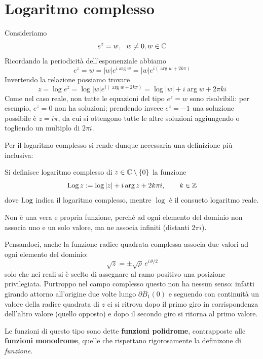 \section{Logaritmo complesso}

Consideriamo
\begin{equation*}
e^{z} = w, \ \ w\neq 0, w\in \mathbb{C}
\end{equation*}
Ricordando la periodicità dell'esponenziale abbiamo
\begin{equation*}
e^{z} = w = |w| e^{i\arg w}= |w| e^{i(\arg w+2k\pi)}
\end{equation*}
Invertendo la relazione possiamo trovare
\begin{equation*}
z=\log e^z=\log |w| e^{i(\arg w+2k\pi)}=\log|w|+i\arg w+2\pi k i
\end{equation*}
Come nel caso reale, non tutte le equazioni del tipo $e^z=w$ sono risolvibili: per esempio, $e^z=0$ non ha soluzioni; prendendo invece $e^z=-1$ una soluzione possibile è $z=i\pi$, da cui si ottengono tutte le altre soluzioni aggiungendo o togliendo un multiplo di $2\pi i$.

Per il logaritmo complesso si rende dunque necessaria una definizione più inclusiva:
\begin{defn}
Si definisce logaritmo complesso di $z\in\mathbb{C}\setminus\{0\}$ la funzione
\begin{equation*}
\operatorname{Log} z:=\log|z|+i\arg z+2k\pi i,\qquad  k\in \mathbb{Z}
\end{equation*}
dove $\operatorname{Log}$ indica il logaritmo complesso, mentre $\log$ è il consueto logaritmo reale.
\end{defn}
Non è una vera e propria funzione, perché ad ogni elemento del dominio non associa uno e un solo valore, ma ne associa infiniti (distanti $2\pi i$).

Pensandoci, anche la funzione radice quadrata complessa associa due valori ad ogni elemento del dominio:
$$
\sqrt{z}=\pm\sqrt{\rho}\,e^{i\,\theta/2}
$$
solo che nei reali si è scelto di assegnare al ramo positivo una posizione privilegiata. Purtroppo nel campo complesso questo non ha nessun senso: infatti girando attorno all'origine due volte lungo $\partial B_1(0)$ e seguendo con continuità un valore della radice quadrata di $z$ ci si ritrova dopo il primo giro in corrispondenza dell'altro valore (quello opposto) e dopo il secondo giro si ritorna al primo valore.

Le funzioni di questo tipo sono dette \textbf{funzioni polidrome}, contrapposte alle \textbf{funzioni monodrome}, quelle che rispettano rigorosamente la definizone di \textit{funzione}. 

